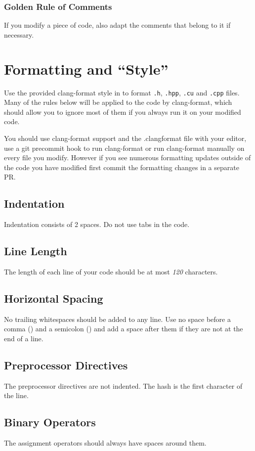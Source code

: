 \subsubsection{Golden Rule of Comments}
If you modify a piece of code, also adapt the comments that belong to it if necessary.

\section{Formatting and ``Style''}
Use the provided clang-format style in  to format \verb|.h|, \verb|.hpp|, \verb|.cu| and \verb|.cpp| files. Many of the rules below will be applied to the code by clang-format, which should allow you to ignore most of them if you always run it on your modified code.

You should use clang-format support and the .clangformat file with your editor, use a git precommit hook to run clang-format or run clang-format manually on every file you modify.  However if you see numerous formatting updates outside of the code you have modified first commit the formatting changes in a separate PR.

\subsection{Indentation}
Indentation consists of 2 spaces.
Do not use tabs in the code.

\subsection{Line Length}
The length of each line of your code should be at most \emph{120} characters.

\subsection{Horizontal Spacing}
No trailing whitespaces should be added to any line.
Use no space before a comma (\inlinecode{,}) and a semicolon (\inlinecode{;}) and add a space after them if they are not at the end of a line.

\subsection{Preprocessor Directives}
The preprocessor directives are not indented.
The hash is the first character of the line.

\subsection{Binary Operators}
The assignment operators should always have spaces around them.

